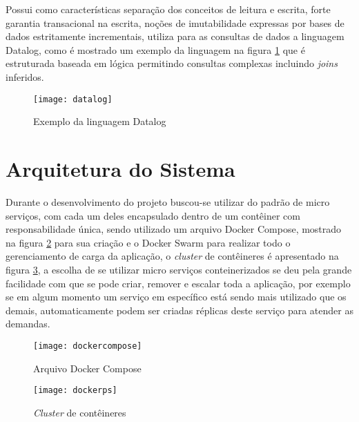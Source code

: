 Possui como características separação dos conceitos de leitura e escrita, forte garantia transacional na escrita, noções de imutabilidade expressas por bases de dados estritamente incrementais, utiliza para as consultas de dados a linguagem Datalog, como é mostrado um exemplo da linguagem na figura \ref{fig:datalog} que é estruturada baseada em lógica permitindo consultas complexas incluindo \textit{joins} inferidos.~\cite{datomic} 

\begin{figure}[!h]
\caption{\label{fig:datalog} Exemplo da linguagem Datalog}
\begin{center}
\texttt{[image: datalog]}
\end{center}
\end{figure}

\section{Arquitetura do Sistema}
Durante o desenvolvimento do projeto buscou-se utilizar do padrão de micro serviços, com cada um deles encapsulado dentro de um contêiner com responsabilidade única, sendo utilizado um arquivo Docker Compose, mostrado na figura \ref{fig:dockercompose} para sua criação e o Docker Swarm para realizar todo o gerenciamento de carga da aplicação, o \textit{cluster} de contêineres é apresentado na figura \ref{fig:dockerps}, a escolha de se utilizar micro serviços conteinerizados se deu pela grande facilidade com que se pode criar, remover e escalar toda a aplicação, por exemplo se em algum momento um serviço em específico está sendo mais utilizado que os demais, automaticamente podem ser criadas réplicas deste serviço para atender as demandas.~\cite{dockerswarm}

\begin{figure}[!h]
\caption{\label{fig:dockercompose} Arquivo Docker Compose}
\begin{center}
\texttt{[image: dockercompose]}
\end{center}
\end{figure}

\begin{figure}[!h]
\caption{\label{fig:dockerps} \textit{Cluster} de contêineres}
\begin{center}
\texttt{[image: dockerps]}
\end{center}
\end{figure}

